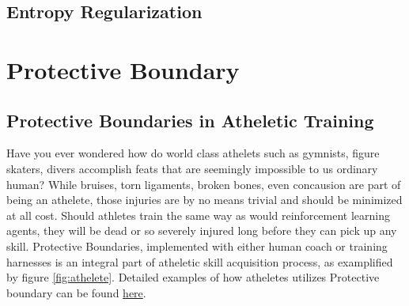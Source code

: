 \documentclass[journal]{IEEEtran}
\begin{document}
\subsection{Entropy Regularization}
\section{Protective Boundary}
\subsection{Protective Boundaries in Atheletic Training}
Have you ever wondered how do world class athelets such as gymnists, figure skaters, divers accomplish feats that are seemingly impossible to us ordinary human?  While bruises, torn ligaments, broken bones, even concausion are part of being an athelete, those injuries are by no means trivial and should be minimized at all cost. Should athletes train the same way as would reinforcement learning agents, they will be dead or so severely injured long before they can pick up any skill. Protective Boundaries, implemented with either human coach or training harnesses is an integral part of atheletic skill acquisition process, as examplified by figure \ref{fig:athelete}. Detailed examples of how atheletes utilizes Protective boundary can be found \href{https://www.youtube.com/playlist?list=PLyqL4-20ZuTRo-DysDQBGDnwZsrySXP4b}{here}.
\end{document}

